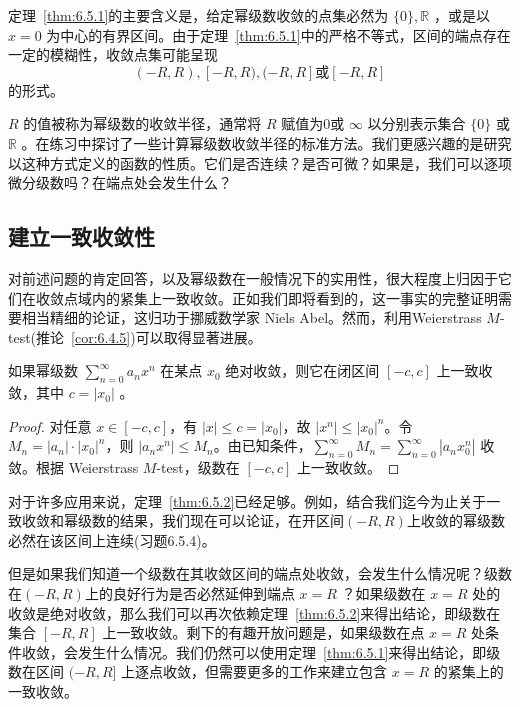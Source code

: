 定理~\ref{thm:6.5.1}的主要含义是，给定幂级数收敛的点集必然为 \(\{ 0\} ,\mathbb{R}\) ，或是以 \(x = 0\) 为中心的有界区间。由于定理~\ref{thm:6.5.1}中的严格不等式，区间的端点存在一定的模糊性，收敛点集可能呈现 \[\left( {-R,R}\right) ,\left\lbrack  {-R,R),( - R,R}\right\rbrack \text{或} \left\lbrack  {-R,R}\right\rbrack\] 的形式。

\(R\) 的值被称为幂级数的收敛半径，通常将 \(R\) 赋值为0或 \(\infty\) 以分别表示集合 \(\{ 0\}\) 或 \(\mathbb{R}\) 。在练习中探讨了一些计算幂级数收敛半径的标准方法。我们更感兴趣的是研究以这种方式定义的函数的性质。它们是否连续？是否可微？如果是，我们可以逐项微分级数吗？在端点处会发生什么？

\subsection{建立一致收敛性}

对前述问题的肯定回答，以及幂级数在一般情况下的实用性，很大程度上归因于它们在收敛点域内的紧集上一致收敛。正如我们即将看到的，这一事实的完整证明需要相当精细的论证，这归功于挪威数学家 Niels Abel。然而，利用Weierstrass $M$-test(推论~\ref{cor:6.4.5})可以取得显著进展。

\begin{Thm}\label{thm:6.5.2}
  如果幂级数 \(\mathop{\sum }\limits_{{n = 0}}^{\infty }{a}_{n}{x}^{n}\) 在某点 \({x}_{0}\) 绝对收敛，则它在闭区间 \(\left\lbrack  {-c,c}\right\rbrack\) 上一致收敛，其中 \(c = \left| {x}_{0}\right|\) 。
\end{Thm}

\begin{proof}
对任意 \(x \in [-c, c]\)，有 \(|x| \leq c = |x_0|\)，故 \(|x^n| \leq |x_0|^n\)。令 \(M_n = |a_n| \cdot |x_0|^n\)，则 \(|a_n x^n| \leq M_n\)。由已知条件，\(\sum_{n=0}^{\infty} M_n = \sum_{n=0}^{\infty} |a_n x_0^n|\) 收敛。根据 Weierstrass $M$-test，级数在 \([-c, c]\) 上一致收敛。
\end{proof}

对于许多应用来说，定理~\ref{thm:6.5.2}已经足够。例如，结合我们迄今为止关于一致收敛和幂级数的结果，我们现在可以论证，在开区间$(-R, R)$上收敛的幂级数必然在该区间上连续(习题6.5.4)。

但是如果我们知道一个级数在其收敛区间的端点处收敛，会发生什么情况呢？级数在$(-R, R)$上的良好行为是否必然延伸到端点 \(x = R\) ？如果级数在 \(x = R\) 处的收敛是绝对收敛，那么我们可以再次依赖定理~\ref{thm:6.5.2}来得出结论，即级数在集合 \(\left\lbrack  {-R,R}\right\rbrack\) 上一致收敛。剩下的有趣开放问题是，如果级数在点 \(x = R\) 处条件收敛，会发生什么情况。我们仍然可以使用定理~\ref{thm:6.5.1}来得出结论，即级数在区间 \(( - R,R\rbrack\) 上逐点收敛，但需要更多的工作来建立包含 \(x = R\) 的紧集上的一致收敛。

